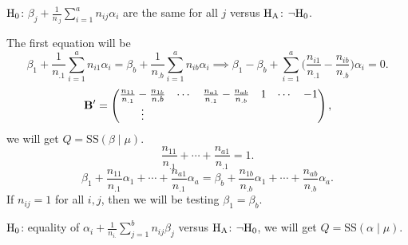 $ \text{H}_0 $: $ \beta_j+\frac{1}{n_{.j}}\sum_{i=1}^a n_{ij}\alpha_i $
are the same for all $ j $ versus $ \text{H}_{\text{A}} $: $ \lnot\text{H}_0 $.

The first equation will be
\[ \beta_1+\frac{1}{n_{.1}}\sum_{i=1}^{a}n_{i1}\alpha_i=\beta_b
    +\frac{1}{n_{.b}}\sum_{i=1}^{a}n_{ib}\alpha_i
    \implies \beta_1-\beta_b+
    \sum_{i=1}^{a}\biggl(\frac{n_{i1}}{n_{.1}}-\frac{n_{ib}}{n_{.b}}\biggr)\alpha_i=0. \]
\[ \mathbf{B}'=\begin{pmatrix}
        \frac{n_{11}}{n_{.1}}-\frac{n_{1b}}{n{.b}} & \cdots & \frac{n_{a1}}{n_{.1}}-\frac{n_{ab}}{n_{.b}} & 1 & \cdots & -1 \\
        \vdots
    \end{pmatrix}, \]
we will get $ Q=\text{SS}(\beta\mid \mu) $.
\[ \frac{n_{11}}{n_{.1}}+\cdots+\frac{n_{a1}}{n_{.1}}=1. \]
\[ \beta_1+\frac{n_{11}}{n_{.1}}\alpha_1+\cdots+\frac{n_{a1}}{n_{.1}}\alpha_a=
    \beta_b+\frac{n_{1b}}{n_{.b}}\alpha_1+\cdots+\frac{n_{ab}}{n_{.b}}\alpha_a. \]
If $ n_{ij}=1 $ for all $ i,j $, then we will be testing $ \beta_1=\beta_b $.

$ \text{H}_0 $: equality of $ \alpha_i+\frac{1}{n_{i.}}\sum_{j=1}^{b}n_{ij}\beta_j $
versus $ \text{H}_{\text{A}} $: $ \lnot \text{H}_0 $, we will get $ Q=\text{SS}(\alpha\mid \mu) $.

